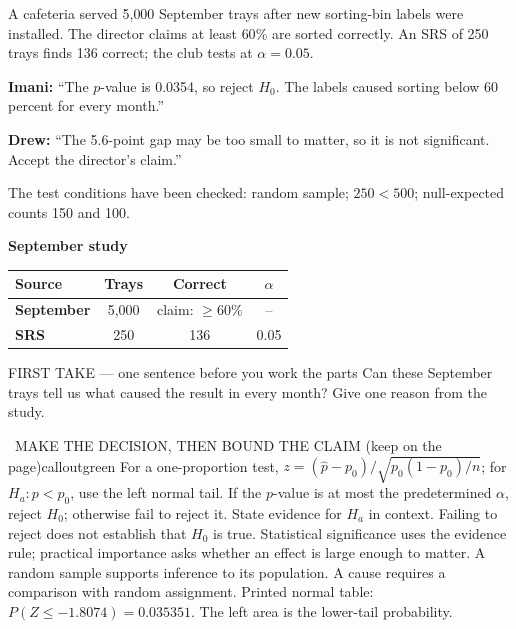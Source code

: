 \documentclass[11pt]{article}
\begin{document}
A cafeteria served 5{,}000 September trays after new sorting-bin labels were installed. The director claims at least $60\%$ are sorted correctly. An SRS of 250 trays finds 136 correct; the club tests at $\alpha=0.05$.\par\smallskip \textbf{Imani:} ``The $p$-value is 0.0354, so reject $H_0$. The labels caused sorting below 60 percent for every month.''\par \textbf{Drew:} ``The 5.6-point gap may be too small to matter, so it is not significant. Accept the director's claim.''\par\smallskip The test conditions have been checked: random sample; $250<500$; null-expected counts 150 and 100.\par
\begin{center}
\textbf{September study}\par\smallskip
\begin{tabular}{|l|c|c|c|}
\hline
\textbf{Source} & \textbf{Trays} & \textbf{Correct} & \textbf{$\alpha$} \\ \hline
\textbf{September} & 5,000 & claim: $\geq 60\%$ & -- \\ \hline
\textbf{SRS} & 250 & 136 & 0.05 \\ \hline
\end{tabular}
\end{center}
\begin{firsttakebox}{FIRST TAKE --- one sentence before you work the parts}
Can these September trays tell us what caused the result in every month? Give one reason from the study.\par
{}
\end{firsttakebox}

\begin{callout}{\IconBook\ MAKE THE DECISION, THEN BOUND THE CLAIM (keep on the page)}{calloutgreen}
For a one-proportion test, $z=(\widehat p-p_0)/\sqrt{p_0(1-p_0)/n}$; for $H_a:p<p_0$, use the left normal tail.
If the $p$-value is at most the predetermined $\alpha$, reject $H_0$; otherwise fail to reject it.
State evidence for $H_a$ in context. Failing to reject does not establish that $H_0$ is true.
Statistical significance uses the evidence rule; practical importance asks whether an effect is large enough to matter.
A random sample supports inference to its population. A cause requires a comparison with random assignment.
Printed normal table: $P(Z\leq-1.8074)=0.035351$. The left area is the lower-tail probability.
\end{callout}
\end{document}
